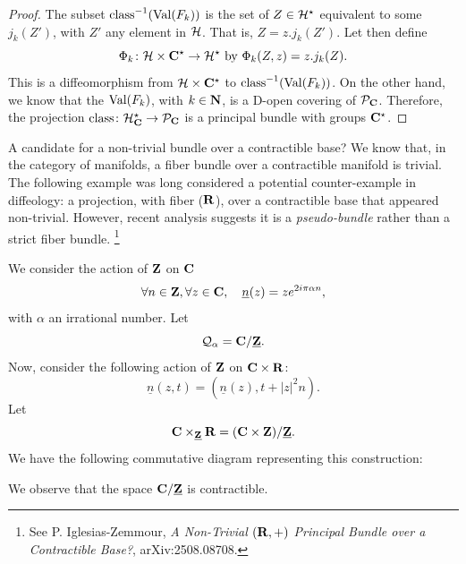 \begin{proof}
  The subset $\operatorname{class}^{-1}(\operatorname{Val}(F_k))$ is the set of $Z \in \mathcal{H}^\star$ equivalent to some $j_k(Z')$,
  with $Z'$ any element in $\mathcal{H}$.
  That is,
  $Z = z.j_k(Z')$.
  Let then define
  $$%
    \Phi_k \colon \cH \times \CC^\star \to \cH^\star
    \SpacedText{by}
    \Phi_k(Z,z) = z.j_k(Z).
  $$%
  This is a diffeomorphism from $\mathcal{H} \times \mathbf{C}^\star$ to $\operatorname{class}^{-1}(\operatorname{Val}(F_k))$.
  On the other hand,
  we know that the $\operatorname{Val}(F_k)$,
  with $k\in \mathbf{N}$,
  is a D-open covering of $\mathcal{P}_{\mathbf{C}}$.
  Therefore,
  the projection $\operatorname{class} \colon \mathcal{H}_{\mathbf{C}}^{\star} \to \mathcal{P}_{\mathbf{C}}$ is a principal bundle with groups $\mathbf{C}^\star$.
\end{proof}

\begin{Article}{A candidate for a non-trivial bundle over a contractible base?}{} \newline %
  We know that,
  in the category of manifolds,
  a fiber bundle over a contractible manifold is trivial.
  The following example was long considered a potential counter-exam\-ple in diffeology:
  a projection,
  with fiber ($\mathbf{R}$),
  over a contractible base that appeared non-trivial.
  However,
  recent analysis suggests it is a \emph{pseudo-bundle} rather than a strict fiber bundle.%
  \footnote{See P. Iglesias-Zemmour, \emph{A Non-Trivial $(\mathbf{R},+)$ Principal Bundle over a Contractible Base?}, arXiv:2508.08708.}

  We consider the action of $\mathbf{Z}$ on $\mathbf{C}$
  $$%
    \forall n \in \ZZ, \forall z \in \CC, \quad \underline{n}(z) = z e^{2 i \pi \alpha n},
  $$%
  with $\alpha$ an irrational number.
  Let
  $$%
    \cQ_\alpha = \CC/\underline{\ZZ}.
  $$%
  Now,
  consider the following action of $\mathbf{Z}$ on $\mathbf{C} \times \mathbf{R}$:
  $$%
    \underline{n}(z,t) = (\underline{n}(z), t + |z|^2n).
  $$%
  Let
  $$%
    \CC \times_{\underline{\ZZ}} \RR = (\CC \times \ZZ)/\underline{\ZZ}.
  $$%
  We have the following commutative diagram representing this construction:
  \begin{center}
  \end{center}
  We observe that the space $\mathbf{C}/\underline{\mathbf{Z}}$ is contractible.


\end{Article}
